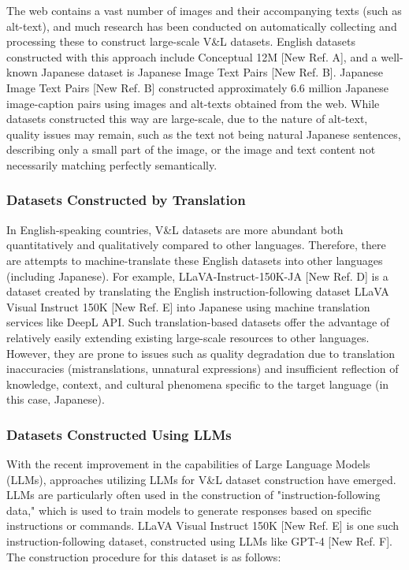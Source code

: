 \documentclass[11pt]{article}
\begin{document}
The web contains a vast number of images and their accompanying texts (such as alt-text), and much research has been conducted on automatically collecting and processing these to construct large-scale V\&L datasets. English datasets constructed with this approach include Conceptual 12M [New Ref. A], and a well-known Japanese dataset is Japanese Image Text Pairs [New Ref. B].
Japanese Image Text Pairs [New Ref. B] constructed approximately 6.6 million Japanese image-caption pairs using images and alt-texts obtained from the web.
While datasets constructed this way are large-scale, due to the nature of alt-text, quality issues may remain, such as the text not being natural Japanese sentences, describing only a small part of the image, or the image and text content not necessarily matching perfectly semantically.

\subsubsection{Datasets Constructed by Translation}

In English-speaking countries, V\&L datasets are more abundant both quantitatively and qualitatively compared to other languages. Therefore, there are attempts to machine-translate these English datasets into other languages (including Japanese). For example, LLaVA-Instruct-150K-JA [New Ref. D] is a dataset created by translating the English instruction-following dataset LLaVA Visual Instruct 150K [New Ref. E] into Japanese using machine translation services like DeepL API.
Such translation-based datasets offer the advantage of relatively easily extending existing large-scale resources to other languages. However, they are prone to issues such as quality degradation due to translation inaccuracies (mistranslations, unnatural expressions) and insufficient reflection of knowledge, context, and cultural phenomena specific to the target language (in this case, Japanese).

\subsubsection{Datasets Constructed Using LLMs}

With the recent improvement in the capabilities of Large Language Models (LLMs), approaches utilizing LLMs for V\&L dataset construction have emerged. LLMs are particularly often used in the construction of "instruction-following data," which is used to train models to generate responses based on specific instructions or commands.
LLaVA Visual Instruct 150K [New Ref. E] is one such instruction-following dataset, constructed using LLMs like GPT-4 [New Ref. F]. The construction procedure for this dataset is as follows:
\end{document}
